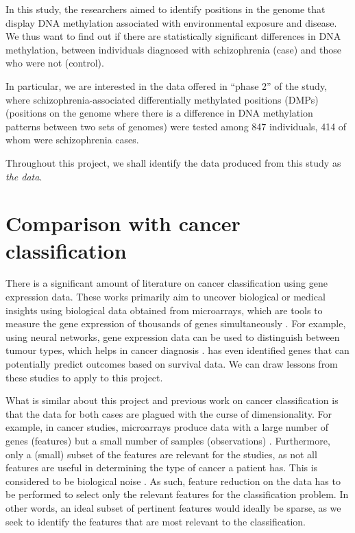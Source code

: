 \documentclass[12pt, twoside, a4paper]{report}
\begin{document}

In this study, the researchers aimed to identify positions in the genome that display DNA methylation associated with environmental exposure and disease. We thus want to find out if there are statistically significant differences in DNA methylation, between individuals diagnosed with schizophrenia (case) and those who were not (control).

In particular, we are interested in the data offered in ``phase 2'' of the study, where schizophrenia-associated differentially methylated positions (DMPs) (positions on the genome where there is a difference in DNA methylation patterns between two sets of genomes) were tested among 847 individuals, 414 of whom were schizophrenia cases.

Throughout this project, we shall identify the data produced from this study as \textit{the data}.


\section{Comparison with cancer classification} \label{bg:cancer}

There is a significant amount of literature on cancer classification using gene expression data. These works primarily aim to uncover biological or medical insights using biological data obtained from microarrays, which are tools to measure the gene expression of thousands of genes simultaneously \citep{RefWorks:79}. For example, using neural networks, gene expression data can be used to distinguish between tumour types, which helps in cancer diagnosis \citep{RefWorks:80, RefWorks:88}. \cite{RefWorks:196} has even identified genes that can potentially predict outcomes based on survival data. We can draw lessons from these studies to apply to this project.

What is similar about this project and previous work on cancer classification is that the data for both cases are plagued with the curse of dimensionality. For example, in cancer studies, microarrays produce data with a large number of genes (features) but a small number of samples (observations) \cite{RefWorks:88}. Furthermore, only a (small) subset of the features are relevant for the studies, as not all features are useful in determining the type of cancer a patient has. This is considered to be biological noise \cite{RefWorks:89}. As such, feature reduction on the data has to be performed to select only the relevant features for the classification problem. In other words, an ideal subset of pertinent features would ideally be sparse, as we seek to identify the features that are most relevant to the classification.
\end{document}
